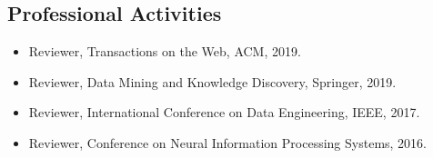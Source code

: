 \documentclass[12pt,]{scrartcl}
\begin{document}
\subsection{Professional Activities}\label{professional-activities}

\begin{itemize}
  \leftskip-0.25in
  \item Reviewer, Transactions on the Web, ACM, 2019.
  \item Reviewer, Data Mining and Knowledge Discovery, Springer, 2019.
  \item Reviewer, International Conference on Data Engineering, IEEE, 2017.
  \item Reviewer, Conference on Neural Information Processing Systems, 2016.
\end{itemize}
\end{document}

